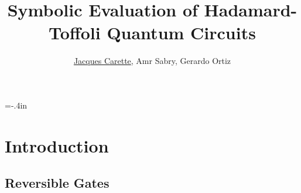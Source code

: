 \documentclass{beamer}
\title[\pgfuseimage{logo}] %
{Symbolic Evaluation of Hadamard-Toffoli Quantum Circuits}
\author[]{\underline{Jacques Carette}, Amr Sabry, Gerardo Ortiz}
\begin{document}
\hoffset=-.4in %
\begin{frame}[plain]

\titlepage

\end{frame}
\hoffset=0in %


\section[Introduction]{Introduction}

\subsection[Reversible]{Reversible Gates}
\end{document}
